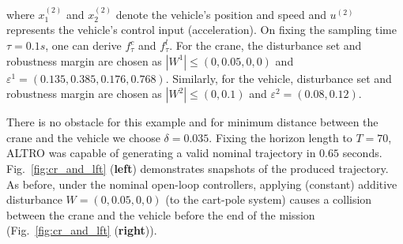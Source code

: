where $x_1^{(2)}$ and $x_2^{(2)}$ denote the vehicle's position  and speed  and $u^{(2)}$ represents the vehicle's control input (acceleration). 
On fixing the sampling time $\tau=0.1s$, one can derive $f^c_\tau$ and $f^l_\tau$. For the crane, the disturbance set and robustness margin are chosen as $|W^1|\leq(0,0.05,0,0)$ and  $\varepsilon^{1}=(0.135,0.385,0.176 ,0.768)$. Similarly, for the vehicle, disturbance set and robustness margin are chosen as $|W^2|\leq(0,0.1)$ and $\varepsilon^{2}=(0.08,0.12)$.

There is no obstacle for this example and for minimum distance between the crane and the vehicle we choose $\delta=0.035$.
Fixing the horizon length to $T=70$, ALTRO was capable of generating a valid nominal trajectory in $0.65$ seconds. 
Fig.~\ref{fig:cr_and_lft} (\textbf{left}) demonstrates snapshots of the produced trajectory. 
As before, under the nominal open-loop controllers, applying (constant) additive disturbance $W=(0,0.05,0,0)$ (to the cart-pole system) 
causes a collision between the crane and the vehicle before the end of the mission (Fig.~\ref{fig:cr_and_lft} (\textbf{right})).

